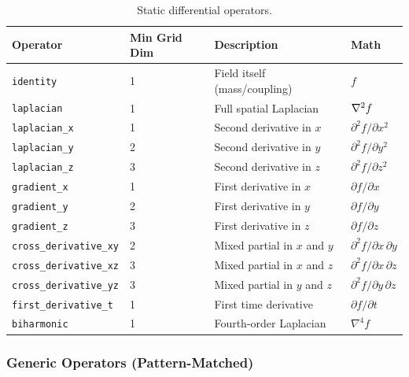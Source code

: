 \begin{table}[htbp]
\centering
\caption{Static differential operators.}
\label{tab:json-static-operators}
\begin{tabular}{@{}llll@{}}
\toprule
Operator & Min Grid Dim & Description & Math \\
\midrule
\texttt{identity}            & 1 & Field itself (mass/coupling)    & $f$ \\
\texttt{laplacian}           & 1 & Full spatial Laplacian          & $\nabla^2 f$ \\
\texttt{laplacian\_x}         & 1 & Second derivative in $x$        & $\partial^2 f / \partial x^2$ \\
\texttt{laplacian\_y}         & 2 & Second derivative in $y$        & $\partial^2 f / \partial y^2$ \\
\texttt{laplacian\_z}         & 3 & Second derivative in $z$        & $\partial^2 f / \partial z^2$ \\
\texttt{gradient\_x}          & 1 & First derivative in $x$         & $\partial f / \partial x$ \\
\texttt{gradient\_y}          & 2 & First derivative in $y$         & $\partial f / \partial y$ \\
\texttt{gradient\_z}          & 3 & First derivative in $z$         & $\partial f / \partial z$ \\
\texttt{cross\_derivative\_xy} & 2 & Mixed partial in $x$ and $y$    & $\partial^2 f / \partial x\, \partial y$ \\
\texttt{cross\_derivative\_xz} & 3 & Mixed partial in $x$ and $z$    & $\partial^2 f / \partial x\, \partial z$ \\
\texttt{cross\_derivative\_yz} & 3 & Mixed partial in $y$ and $z$    & $\partial^2 f / \partial y\, \partial z$ \\
\texttt{first\_derivative\_t}  & 1 & First time derivative           & $\partial f / \partial t$ \\
\texttt{biharmonic}          & 1 & Fourth-order Laplacian          & $\nabla^4 f$ \\
\bottomrule
\end{tabular}
\end{table}

\subsubsection{Generic Operators (Pattern-Matched)}
\label{sec:json-generic-operators}

